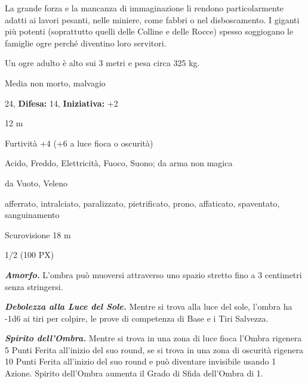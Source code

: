 \begin{multicols}{2}
{La grande forza e la mancanza di immaginazione li rendono particolarmente adatti ai lavori pesanti, nelle miniere, come fabbri o nel disboscamento. I giganti più potenti (soprattutto quelli delle Colline e delle Rocce) spesso soggiogano le famiglie ogre perché diventino loro servitori.

Un ogre adulto è alto sui 3 metri e pesa circa 325 kg.

\noindent
\begin{description}[noitemsep, topsep=0pt, parsep=0pt, partopsep=0pt, leftmargin=0cm, labelwidth=2.2cm]
	\item[\textbf{Taglia/Tipo:}] Media non morto, malvagio
	\item[\textbf{Caratt.:}] 
	\item[\textbf{Punti Ferita:}] 24,  \textbf{Difesa:} 14,  \textbf{Iniziativa:} +2
	\item[\textbf{Movimento:}] 12 m
	\item[\textbf{Tiri Salvez.:}] 
	\item[\textbf{Comp.:}] Furtività +4 (+6 a luce fioca o oscurità)
	\item[\textbf{Res. Danni:}] Acido, Freddo, Elettricità, Fuoco, Suono; da arma non magica
	\item[\textbf{Imm. Danni:}] da Vuoto, Veleno
	\item[\textbf{Immunità:}] afferrato, intralciato, paralizzato, pietrificato, prono, affaticato, spaventato, sanguinamento
	\item[\textbf{Sensi:}] Scurovisione 18 m
	\item[\textbf{Sfida:}] 1/2 (100 PX)\smallskip
\end{description}

\emph{\textbf{Amorfo.}} L'ombra può muoversi attraverso uno spazio stretto fino a 3 centimetri senza stringersi.

\emph{\textbf{Debolezza alla Luce del Sole.}} Mentre si trova alla luce del sole, l'ombra ha -1d6 ai tiri per colpire, le prove di competenza di Base e i Tiri Salvezza.

\emph{\textbf{Spirito dell'Ombra.}} Mentre si trova in una zona di luce fioca l'Ombra rigenera 5 Punti Ferita all'inizio del suo round, se si trova in una zona di oscurità rigenera 10 Punti Ferita all'inizio del suo round e può diventare invisibile usando 1 Azione. Spirito dell'Ombra aumenta il Grado di Sfida dell'Ombra di 1.

}
\end{multicols}
